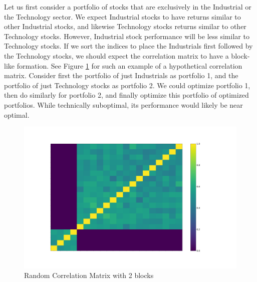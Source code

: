 \documentclass[10pt,twoside,titlepage]{article}   %
\begin{document}
Let us first consider a portfolio of stocks that are exclusively in the Industrial or the Technology sector. 
We expect Industrial stocks to have returns similar to other Industrial stocks, and likewise Technology stocks returns similar to other Technology stocks. 
However, Industrial stock performance will be less similar to Technology stocks. 
If we sort the indices to place the Industrials first followed by the Technology stocks, 
we should expect the correlation matrix to have a block-like formation. 
See Figure \ref{figRandomCorr} for such an example of a hypothetical correlation matrix. 
Consider first the portfolio of just Industrials as portfolio 1, 
and the portfolio of just Technology stocks as portfolio 2. 
We could optimize portfolio 1, then do similarly for portfolio 2, 
and finally optimize this portfolio of optimized portfolios. 
While technically suboptimal, its performance would likely be near optimal. 

\noindent
\begin{figure}[h]
\includegraphics[width = 1.00\textwidth]{BlockCorr.png}
\vspace{-1.75\baselineskip}
\caption{Random Correlation Matrix with 2 blocks}
\label{figRandomCorr}
\end{figure}
\end{document}
